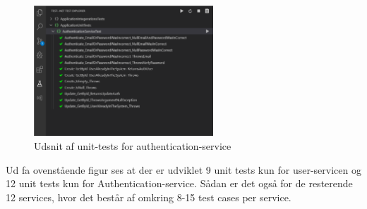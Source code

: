 \newpage

\begin{figure}[ht]
    \centering
\includegraphics[width=0.6\textwidth]{Unit-Test-image/Auth-service.pdf}
\caption{Udsnit af unit-tests for authentication-service}
\label{fig:figure2}
\end{figure}

Ud fa ovenstående figur ses at der er udviklet 9 unit tests kun for user-servicen og 12 unit tests kun for Authentication-service. Sådan er det også for de resterende 12 services, hvor det består af omkring 8-15 test cases per service. 
